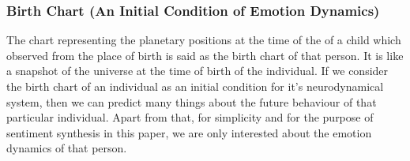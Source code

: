 \subsubsection{Birth Chart (An Initial Condition of Emotion Dynamics)}
The chart representing the planetary positions at the
time of the of a child which observed from the place
of birth is said as the birth chart of that person. It is like a snapshot of the universe at the time of birth of the individual. If we consider the birth chart of an individual as an initial condition for it’s neurodynamical system, then we can predict many things about the future behaviour of that particular individual. Apart from that, for simplicity and for the purpose of sentiment synthesis in this paper, we are only interested about the emotion dynamics of that person.
